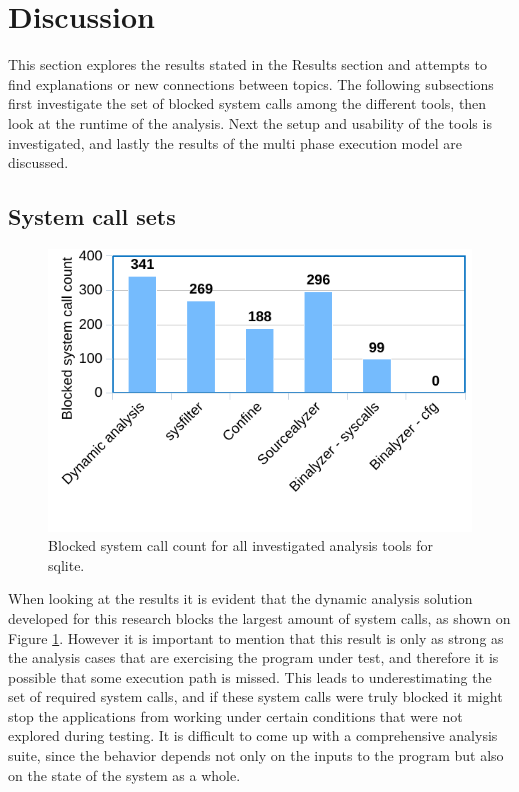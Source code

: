 \section{Discussion}
\label{sec:discussion}
This section explores the results stated in the Results section and attempts to find explanations or new connections between topics.
The following subsections first investigate the set of blocked system calls among the different tools, then look at the runtime of the analysis.
Next the setup and usability of the tools is investigated, and lastly the results of the multi phase execution model are discussed.

\subsection {System call sets}
\begin{figure}
    \centering
    \includegraphics[width=\columnwidth]{./chart_syscalls.png}
    \caption{Blocked system call count for all investigated analysis tools for sqlite.}
    \label{fig:block_count}
\end{figure}
When looking at the results it is evident that the dynamic analysis solution developed for this research blocks the largest amount of system calls, as shown on Figure \ref{fig:block_count}.
However it is important to mention that this result is only as strong as the analysis cases that are exercising the program under test, and therefore it is possible that some execution path is missed.
This leads to underestimating the set of required system calls, and if these system calls were truly blocked it might stop the applications from working under certain conditions that were not explored during testing.
It is difficult to come up with a comprehensive analysis suite, since the behavior depends not only on the inputs to the program but also on the state of the system as a whole.


